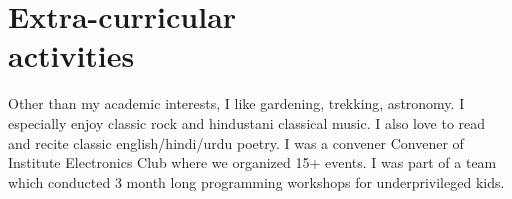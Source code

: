 \documentclass[margin,line, 9pt]{res}
\begin{document}
\begin{resume}
\begin{tabular}{@{}p{1.3in}p{4.3in}}
\end{tabular}


\section{\sc Extra-curricular \\ activities}
Other than my academic interests, I like gardening, trekking, astronomy. I especially enjoy classic rock and hindustani classical music. I also love to read and recite classic english/hindi/urdu poetry. I was a convener Convener of Institute Electronics Club where we organized 15+ events. I was part of a team which conducted 3 month long programming workshops for underprivileged kids.




\end{resume}
\end{document}
